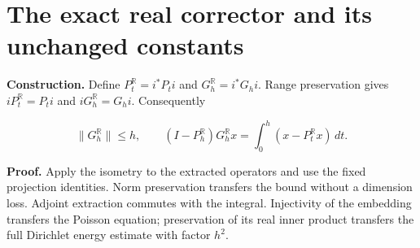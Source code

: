 \documentclass[11pt,a4paper]{article}
\begin{document}
\section{\texorpdfstring{The exact real corrector and its unchanged constants}{The exact real corrector and its unchanged constants}}


\textbf{Construction.} Define \(P_t^{\mathbb R}=i^*P_ti\) and \(G_h^{\mathbb R}=i^*G_hi\). Range preservation gives \(iP_t^{\mathbb R}=P_ti\) and \(iG_h^{\mathbb R}=G_hi\). Consequently

\[\|G_h^{\mathbb R}\|\le h,\qquad (I-P_h^{\mathbb R})G_h^{\mathbb R}x=\int_0^h(x-P_t^{\mathbb R}x)\,dt.\]

\textbf{Proof.} Apply the isometry to the extracted operators and use the fixed projection identities. Norm preservation transfers the bound without a dimension loss. Adjoint extraction commutes with the integral. Injectivity of the embedding transfers the Poisson equation; preservation of its real inner product transfers the full Dirichlet energy estimate with factor \(h^2\).
\end{document}
